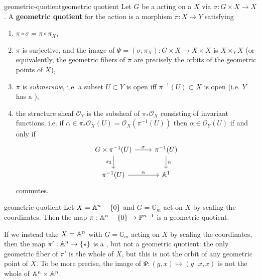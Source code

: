 \begin{topic}{geometric-quotient}{geometric quotient}
    Let $G$ be a  acting on a  $X$ via $\sigma : G \times X \to X$. A \textbf{geometric quotient} for the action is a morphism $\pi : X \to Y$ satisfying
    \begin{enumerate}[i]
        \item $\pi \circ \sigma = \pi \circ \pi_X$,
        \item $\pi$ is surjective, and the image of $\Psi = (\sigma, \pi_X) : G \times X \to X \times X$ is $X \times_Y X$ (or equivalently, the geometric fibers of $\pi$ are precisely the orbits of the geometric points of $X$),
        \item $\pi$ is \textit{submersive}, i.e. a subset $U \subset Y$ is open iff $\pi^{-1}(U) \subset X$ is open (i.e. $Y$ has a ),
        \item the structure sheaf $\mathcal{O}_Y$ is the subsheaf of $\pi_* \mathcal{O}_X$ consisting of invariant functions, i.e. if $\alpha \in \pi_* \mathcal{O}_X(U) = \mathcal{O}_X(\pi^{-1}(U))$ then $\alpha \in \mathcal{O}_Y(U)$ if and only if
        \[ \begin{tikzcd} G \times \pi^{-1}(U) \arrow{r}{\sigma} \arrow[swap]{d}{\pi_2} & \pi^{-1}(U) \arrow{d}{\alpha} \\ \pi^{-1}(U) \arrow{r}{\alpha} & \AA^1 \end{tikzcd} \]
        commutes.
    \end{enumerate}
\end{topic}

\begin{example}{geometric-quotient}
    Let $X = \AA^n - \{ 0 \}$ and $G = \mathbb{G}_m$ act on $X$ by scaling the coordinates. Then the map $\pi : \AA^n - \{ 0 \} \to \PP^{n - 1}$ is a geometric quotient.
    
    If we instead take $X = \AA^n$ with $G = \mathbb{G}_m$ acting on $X$ by scaling the coordinates, then the map $\pi' : \AA^n \to \{ \star \}$ is a , but not a geometric quotient: the only geometric fiber of $\pi'$ is the whole of $X$, but this is not the orbit of any geometric point of $X$. To be more precise, the image of $\Psi : (g, x) \mapsto (g \cdot x, x)$ is not the whole of $\AA^n \times \AA^n$.
\end{example}

